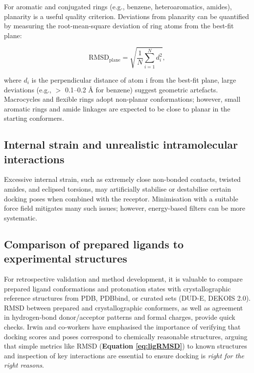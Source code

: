 \documentclass[12pt]{article}
\begin{document}
For aromatic and conjugated rings (e.g., benzene, heteroaromatics, amides), planarity is a useful quality criterion. Deviations from planarity can be quantified by measuring the root-mean-square deviation of ring atoms from the best-fit plane:

\begin{equation}
\mathrm{RMSD}_{\mathrm{plane}} = \sqrt{\frac{1}{N} \sum_{i=1}^{N} d_i^2},
\end{equation}

where $d_i$ is the perpendicular distance of atom i from the best-fit plane, large deviations (e.g., $>$ 0.1--0.2 \r{A} for benzene) suggest geometric artefacts. Macrocycles and flexible rings adopt non-planar conformations; however, small aromatic rings and amide linkages are expected to be close to planar in the starting conformers.

\subsection{Internal strain and unrealistic intramolecular interactions}

Excessive internal strain, such as extremely close non-bonded contacts, twisted amides, and eclipsed torsions, may artificially stabilise or destabilise certain docking poses when combined with the receptor. Minimisation with a suitable force field mitigates many such issues; however, energy-based filters can be more systematic.

\subsection{Comparison of prepared ligands to experimental structures}

For retrospective validation and method development, it is valuable to compare prepared ligand conformations and protonation states with crystallographic reference structures from PDB, PDBbind, or curated sets (DUD-E, DEKOIS 2.0). RMSD between prepared and crystallographic conformers, as well as agreement in hydrogen-bond donor/acceptor patterns and formal charges, provide quick checks\cite{CH6_Hawkins2010,CH6_WangPDBbind}. Irwin and co-workers\cite{CH6_Irwin2005} have emphasised the importance of verifying that docking scores and poses correspond to chemically reasonable structures, arguing that simple metrics like RMSD (\textbf{Equation \ref{eq:ligRMSD}}) to known structures and inspection of key interactions are essential to ensure docking is \emph{right for the right reasons}. 
\end{document}
